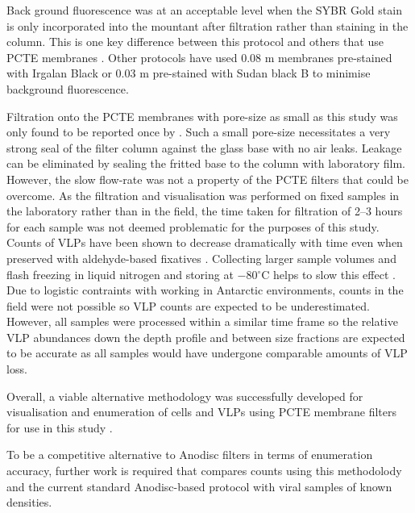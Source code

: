 Back ground fluorescence was at an acceptable level when the SYBR Gold stain is only incorporated into the mountant after filtration rather than staining in the column.
This is one key difference between this protocol and others that use \ac{PCTE} membranes \cite{Hara1991, Proctor1992, Diemer2012}.
Other protocols have used 0.08 \textmu{}m membranes pre-stained with Irgalan Black \cite{Proctor1992} or 0.03 \textmu{}m pre-stained with Sudan black B \cite{Diemer2012} to minimise background fluorescence.

Filtration onto the \ac{PCTE} membranes with pore-size as small as this study was only found to be reported once by \citet{Hara1991}.
Such a small pore-size necessitates a very strong seal of the filter column against the glass base with no air leaks.
Leakage can be eliminated by sealing the fritted base to the column with laboratory film. 
However, the slow flow-rate was not a property of the \ac{PCTE} filters that could be overcome.
As the filtration and visualisation was performed on fixed samples in the laboratory rather than in the field, the time taken for filtration of 2--3 hours for each sample was not deemed problematic for the purposes of this study.
Counts of \acp{VLP} have been shown to decrease dramatically with time even when preserved with aldehyde-based fixatives \cite{Wen2004}.
Collecting larger sample volumes and flash freezing in liquid nitrogen and storing at $-$80$^{\circ}$C helps to slow this effect \cite{Patel2007}.
Due to logistic contraints with working in Antarctic environments, counts in the field were not possible so \ac{VLP} counts are expected to be underestimated.
However, all samples were processed within a similar time frame so the relative \ac{VLP} abundances down the depth profile and between size fractions are expected to be accurate as all samples would have undergone comparable amounts of \ac{VLP} loss. 

Overall, a viable alternative methodology was successfully developed for visualisation and enumeration of cells and \acp{VLP} using \ac{PCTE} membrane filters for use in this study .

To be a competitive alternative to Anodisc filters in terms of enumeration accuracy, further work is required that compares counts using this methodolody and the current standard Anodisc-based protocol \cite{Patel2007} with viral samples of known densities.


